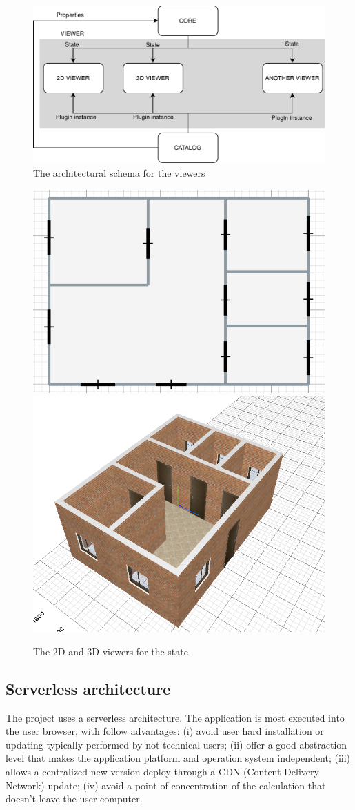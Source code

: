 \begin{figure}[htb]
\centering
\includegraphics[width=\linewidth]{contents/images/diagramma-visualizzatori}

\caption{The architectural schema for the viewers}
\label{fig_viewers}
\end{figure}

\begin{figure}[htb]
\centering
\includegraphics[width=0.45\linewidth]{contents/images/2d-viewer}
\includegraphics[width=0.45\linewidth]{contents/images/3d-viewer}
\caption{The 2D and 3D viewers for the state}
\label{fig_viewer}
\end{figure}

\subsection{Serverless architecture}

The project uses a serverless architecture. The application is most executed into the user browser, with follow advantages: (i) avoid user hard installation or updating typically performed by not technical users; (ii) offer a good abstraction level that makes the application platform and operation system independent; (iii) allows a centralized new version deploy through a CDN (Content Delivery Network) update; (iv) avoid a point of concentration of the calculation that doesn't leave the user computer.

